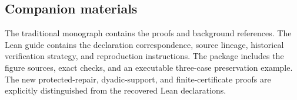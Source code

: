 \documentclass[11pt]{article}
\begin{document}
\subsection*{Companion materials}
The traditional monograph contains the proofs and background references. The Lean guide contains the declaration correspondence, source lineage, historical verification strategy, and reproduction instructions. The package includes the figure sources, exact checks, and an executable three-case preservation example. The new protected-repair, dyadic-support, and finite-certificate proofs are explicitly distinguished from the recovered Lean declarations.
\end{document}
